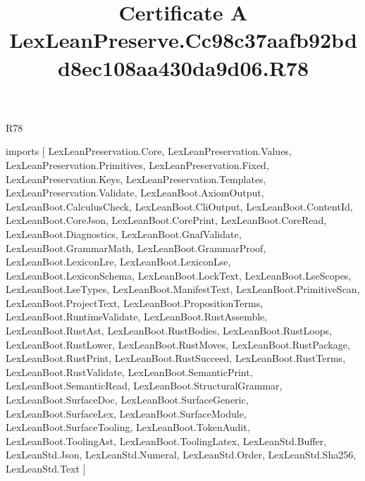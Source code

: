 \begin{lexlean}{R78}
\title{Certificate A LexLeanPreserve.Cc98c37aafb92bdd8ec108aa430da9d06.R78}
\begin{coremodule}
imports [
  LexLeanPreservation.Core,
  LexLeanPreservation.Values,
  LexLeanPreservation.Primitives,
  LexLeanPreservation.Fixed,
  LexLeanPreservation.Keys,
  LexLeanPreservation.Templates,
  LexLeanPreservation.Validate,
  LexLeanBoot.AxiomOutput,
  LexLeanBoot.CalculusCheck,
  LexLeanBoot.CliOutput,
  LexLeanBoot.ContentId,
  LexLeanBoot.CoreJson,
  LexLeanBoot.CorePrint,
  LexLeanBoot.CoreRead,
  LexLeanBoot.Diagnostics,
  LexLeanBoot.GnafValidate,
  LexLeanBoot.GrammarMath,
  LexLeanBoot.GrammarProof,
  LexLeanBoot.LexiconLre,
  LexLeanBoot.LexiconLse,
  LexLeanBoot.LexiconSchema,
  LexLeanBoot.LockText,
  LexLeanBoot.LseScopes,
  LexLeanBoot.LseTypes,
  LexLeanBoot.ManifestText,
  LexLeanBoot.PrimitiveScan,
  LexLeanBoot.ProjectText,
  LexLeanBoot.PropositionTerms,
  LexLeanBoot.RuntimeValidate,
  LexLeanBoot.RustAssemble,
  LexLeanBoot.RustAst,
  LexLeanBoot.RustBodies,
  LexLeanBoot.RustLoops,
  LexLeanBoot.RustLower,
  LexLeanBoot.RustMoves,
  LexLeanBoot.RustPackage,
  LexLeanBoot.RustPrint,
  LexLeanBoot.RustSucceed,
  LexLeanBoot.RustTerms,
  LexLeanBoot.RustValidate,
  LexLeanBoot.SemanticPrint,
  LexLeanBoot.SemanticRead,
  LexLeanBoot.StructuralGrammar,
  LexLeanBoot.SurfaceDoc,
  LexLeanBoot.SurfaceGeneric,
  LexLeanBoot.SurfaceLex,
  LexLeanBoot.SurfaceModule,
  LexLeanBoot.SurfaceTooling,
  LexLeanBoot.TokenAudit,
  LexLeanBoot.ToolingAst,
  LexLeanBoot.ToolingLatex,
  LexLeanStd.Buffer,
  LexLeanStd.Json,
  LexLeanStd.Numeral,
  LexLeanStd.Order,
  LexLeanStd.Sha256,
  LexLeanStd.Text
]


\end{coremodule}
\end{lexlean}
